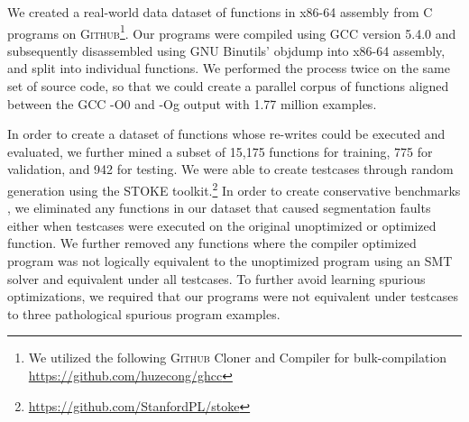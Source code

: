 \documentclass{article}
\newcommand{\GH}{\textsc{Github}}
\begin{document}


We created a real-world data dataset of functions in x86-64 assembly from C programs on \GH \footnote{We utilized the following \GH{}  Cloner and Compiler for bulk-compilation \url{https://github.com/huzecong/ghcc}}. Our programs were compiled using GCC version 5.4.0 and subsequently disassembled using \textsc{GNU} Binutils’ objdump into x86-64 assembly, and split into individual functions. We performed the process twice on the same set of source code, so that we could create a parallel corpus of functions aligned between the GCC -O0 and -Og output with 1.77 million examples. 

In order to create a dataset of functions whose re-writes could be executed and evaluated, we further mined a subset of 15,175 functions for training, 775 for validation, and 942 for testing.   We were able to create testcases through random generation using the \textsc{STOKE} toolkit.\footnote{\url{https://github.com/StanfordPL/stoke}}   In order to create conservative benchmarks , we eliminated any functions in our dataset that caused segmentation faults either when testcases were executed on the original unoptimized or optimized function.  We further removed any functions where the compiler optimized program was not logically equivalent to the unoptimized program using an SMT solver and equivalent under all testcases.  To further avoid learning spurious optimizations, we required that our programs were not equivalent under testcases to three pathological spurious program examples. 
\end{document}
